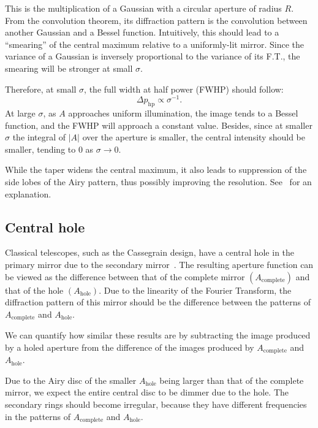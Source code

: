 \documentclass{article}
\newcommand{\R}[1]{\mathrm{#1}}
\begin{document}
This is the multiplication of a Gaussian with a circular aperture of radius $R$. From the convolution theorem, its diffraction pattern is the convolution between another Gaussian and a Bessel function. Intuitively, this should lead to a ``smearing'' of the central maximum relative to a uniformly-lit mirror. Since the variance of a Gaussian is inversely proportional to the variance of its F.T., the smearing will be stronger at small $\sigma$.

Therefore, at small $\sigma$, the full width at half power (FWHP) should follow:
\begin{equation}
    \Delta p_{\R{hp}} \propto \sigma^{-1}.
\end{equation}
At large $\sigma$, as $A$ approaches uniform illumination, the image tends to a Bessel function, and the FWHP will approach a constant value. Besides, since at smaller $\sigma$ the integral of $|A|$ over the aperture is smaller, the central intensity should be smaller, tending to 0 as $\sigma \rightarrow 0$.

While the taper widens the central maximum, it also leads to suppression of the side lobes of the Airy pattern, thus possibly improving the resolution. See~\cite[Section~11.3]{hecht} for an explanation.

\subsection{Central hole}\label{sec:analysis:hole}
Classical telescopes, such as the Cassegrain design, have a central hole in the primary mirror due to the secondary mirror~\cite[Section~7.2.3]{RadioAstro}. The resulting aperture function can be viewed as the difference between that of the complete mirror $(A_{\R{complete}})$ and that of the hole $(A_{\R{hole}})$. Due to the linearity of the Fourier Transform, the diffraction pattern of this mirror should be the difference between the patterns of $A_{\R{complete}}$ and $A_{\R{hole}}$.

We can quantify how similar these results are by subtracting the image produced by a holed aperture from the difference of the images produced by $A_{\R{complete}}$ and $A_{\R{hole}}$.

Due to the Airy disc of the smaller $A_{\R{hole}}$ being larger than that of the complete mirror, we expect the entire central disc to be dimmer due to the hole. The secondary rings should become irregular, because they have different frequencies in the patterns of $A_{\R{complete}}$ and $A_{\R{hole}}$.
\end{document}
